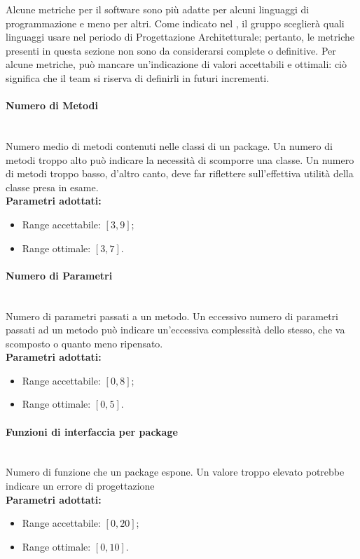 Alcune metriche per il software sono più adatte per alcuni linguaggi di programmazione e meno per altri. Come indicato nel \PdP , il gruppo \gruppo \space sceglierà quali linguaggi usare nel periodo di Progettazione Architetturale; pertanto, le metriche presenti in questa sezione non sono da considerarsi complete o definitive.\newline
Per alcune metriche, può mancare un'indicazione di valori accettabili e ottimali: ciò significa che il team si riserva di definirli in futuri incrementi.

\paragraph{Numero di Metodi}\mbox{}\\[0,3cm]
Numero medio di metodi contenuti nelle classi di un package. Un numero di metodi troppo alto può indicare la necessità di scomporre una classe. Un numero di metodi troppo basso, d'altro canto, deve far riflettere sull'effettiva utilità della classe presa in esame.\\[0,2cm]
\textbf{Parametri adottati:}
\begin{itemize}
	\item Range accettabile: $[3,9]$;
	\item Range ottimale: $[3,7]$.
\end{itemize}

\paragraph{Numero di Parametri}\mbox{}\\[0,3cm]
Numero di parametri passati a un metodo. Un eccessivo numero di parametri passati ad un metodo può indicare un'eccessiva complessità dello stesso, che va scomposto o quanto meno ripensato.\\[0,2cm]
\textbf{Parametri adottati:}
\begin{itemize}
	\item Range accettabile: $[0,8]$;
	\item Range ottimale: $[0,5]$.
\end{itemize}

\paragraph{Funzioni di interfaccia per package}\mbox{}\\[0,3cm]
Numero di funzione che un package espone. Un valore troppo elevato potrebbe indicare un errore di progettazione\\[0,2cm]
\textbf{Parametri adottati:}
\begin{itemize}
	\item Range accettabile: $[0,20]$;
	\item Range ottimale: $[0,10]$.
\end{itemize}

